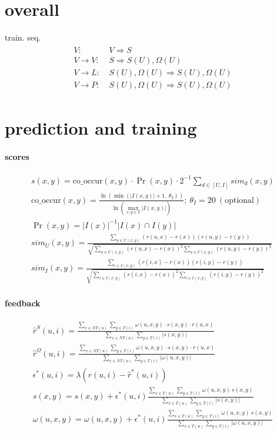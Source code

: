 \documentclass{article}
\begin{document}
\section{overall}
\hspace{0.5cm}train. seq.
\begin{eqnarray}
    \begin{aligned}
    V:~& V \Rightarrow S \\
    V \rightarrow V:~& S \Rightarrow S(U), \Omega(U) \\
    V \rightarrow L:~& S(U), \Omega(U) \Rightarrow S(U), \Omega(U) \\
    V \rightarrow P:~& S(U), \Omega(U) \Rightarrow S(U), \Omega(U) \nonumber
\end{aligned}
\end{eqnarray}

\section{prediction and training}
\paragraph{scores}
\begin{gather}
s(x,y)=\text{co\_occur}(x,y)\cdot \Pr(x,y)\cdot 2^{-1}\sum_{d \in [U, I]}sim_{d}(x,y) \label{eq:tags_distances} \\
\text{co\_occur}(x,y)=\frac{\ln(\min (|I(x,y)| + 1,~ \theta_{I}))}{\ln(\max_{x, y \in T} |I(x,y)|)};~\theta_{I}=20~(\text{optional}) \\
\Pr(x,y)=|I(x)|^{-1}|I(x)\cap I(y)| \\ 
sim_{U}(x,y)=\frac{\sum_{u \in U(x,y)}(r(u,x)-r(x))(r(u,y)-r(y))}{\sqrt{\sum_{u \in U(x,y)}(r(u,x)-r(x))^{2}\sum_{u \in U(x,y)}(r(u,y)-r(y))^{2}}} \\
sim_{I}(x,y)=\frac{\sum_{i \in I(x,y)}(r(i,x)-r(x))(r(i,y)-r(y))}{\sqrt{\sum_{i \in I(x,y)}(r(i,x)-r(x))^{2}\sum_{i \in I(x,y)}(r(i,y)-r(y))^{2}}}
\end{gather}

\paragraph{feedback}
\begin{gather}
    \hat{r}^{S}(u,i)=\frac{\sum_{x \in NT(u)}\sum_{y \in T(i)} \omega(u,x,y)\cdot s(x,y) \cdot r(u,x)}{\sum_{x \in NT(u)}\sum_{y \in T(i)}|s(x,y)|} \\
    \hat{r}^{\Omega}(u,i)=\frac{\sum_{x \in NT(u)}\sum_{y \in T(i)} \omega(u,x,y)\cdot s(x,y) \cdot r(u,x)}{\sum_{x \in NT(u)}\sum_{y \in T(i)}|\omega(u,x,y)|} \\
    \epsilon^{*}(u,i) = \lambda \left(r(u,i) - \hat{r}^{*}(u,i)\right) \\
    s(x,y)=s(x,y)+\epsilon^{*}(u,i)\frac{\sum_{x \in T(u)}\sum_{y \in T(i)}\omega(u,x,y)~s(x,y)}{\sum_{x \in T(u)}\sum_{y \in T(i)} |s(x,y)|} \\
    \omega(u,x,y)=\omega(u,x,y)+\epsilon^{*}(u,i)\frac{\sum_{x \in T(u)}\sum_{y \in T(i)}\omega(u,x,y)~s(x,y)}{\sum_{x \in T(u)}\sum_{y \in T(i)} |\omega(u,x,y)|}
\end{gather}
\end{document}
